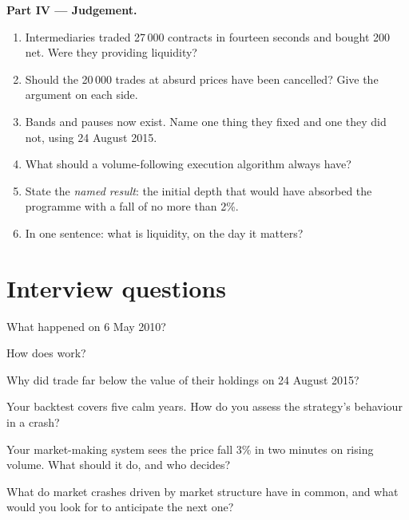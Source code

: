 \begin{problem}
\medskip\noindent\textbf{Part IV --- Judgement.}
\begin{enumerate}[resume]
\item Intermediaries traded 27\,000 contracts in fourteen seconds and bought
200 net. Were they providing liquidity?
\item Should the 20\,000 trades at absurd prices have been cancelled? Give
the argument on each side.
\item Bands and pauses now exist. Name one thing they fixed and one they did
not, using 24 August 2015.
\item What should a volume-following execution algorithm always have?
\item State the \emph{named result}: the initial depth that would have
absorbed the programme with a fall of no more than 2\%.
\item In one sentence: what is liquidity, on the day it matters?
\end{enumerate}
\end{problem}

\section{Interview questions}

\begin{interviewq}\label{iq:m1:stress-case-studies:1}
What happened on 6 May 2010?
\end{interviewq}

\begin{interviewq}\label{iq:m1:stress-case-studies:2}
How does  work?
\end{interviewq}

\begin{interviewq}\label{iq:m1:stress-case-studies:3}
Why did  trade far below the value of their holdings on
24 August 2015?
\end{interviewq}

\begin{interviewq}\label{iq:m1:stress-case-studies:4}
Your backtest covers five calm years. How do you assess the strategy's
behaviour in a crash?
\end{interviewq}

\begin{interviewq}\label{iq:m1:stress-case-studies:5}
Your market-making system sees the price fall 3\% in two minutes on rising
volume. What should it do, and who decides?
\end{interviewq}

\begin{interviewq}\label{iq:m1:stress-case-studies:6}
What do market crashes driven by market structure have in common, and what
would you look for to anticipate the next one?
\end{interviewq}
